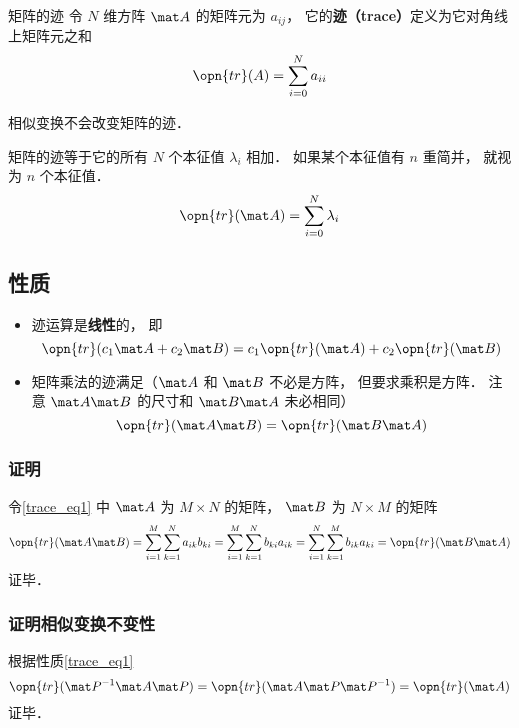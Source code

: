 
\begin{definition}{矩阵的迹}
令 $N$ 维方阵 $\mat A$ 的矩阵元为 $a_{ij}$， 它的\textbf{迹（trace）}定义为它对角线上矩阵元之和
\begin{equation}
\opn{tr}(A) = \sum_{i=0}^N a_{ii}
\end{equation}
\end{definition}

\begin{theorem}{}
相似变换不会改变矩阵的迹．
\end{theorem}

\begin{corollary}{}
矩阵的迹等于它的所有 $N$ 个本征值 $\lambda_i$ 相加． 如果某个本征值有 $n$ 重简并， 就视为 $n$ 个本征值．
\begin{equation}
\opn{tr}(\mat A) = \sum_{i=0}^N \lambda_i
\end{equation}
\end{corollary}

\subsection{性质}
\begin{itemize}
\item 迹运算是\textbf{线性}的， 即
\begin{equation}
\opn{tr}(c_1\mat A+c_2\mat B) = c_1\opn{tr}(\mat A) + c_2\opn{tr}(\mat B)
\end{equation}

\item 矩阵乘法的迹满足（$\mat A$ 和 $\mat B$ 不必是方阵， 但要求乘积是方阵． 注意 $\mat A\mat B$ 的尺寸和 $\mat B\mat A$ 未必相同）
\begin{equation}\label{trace_eq1}
\opn{tr}(\mat A\mat B) = \opn{tr}(\mat B\mat A)
\end{equation}
\end{itemize}

\subsubsection{证明}
令\autoref{trace_eq1} 中 $\mat A$ 为 $M\times N$ 的矩阵， $\mat B$ 为 $N\times M$ 的矩阵
\begin{equation}
\opn{tr}(\mat A\mat B) = \sum_{i=1}^M \sum_{k=1}^N a_{ik}b_{ki} = \sum_{i=1}^M \sum_{k=1}^N b_{ki}a_{ik} = \sum_{i=1}^N \sum_{k=1}^M b_{ik}a_{ki} = \opn{tr}(\mat B\mat A)
\end{equation}
证毕．

\subsubsection{证明相似变换不变性}
根据性质\autoref{trace_eq1}
\begin{equation}
\opn{tr}(\mat P^{-1}\mat A\mat P) = \opn{tr}(\mat A\mat P\mat P^{-1}) = \opn{tr}(\mat A)
\end{equation}
证毕．
